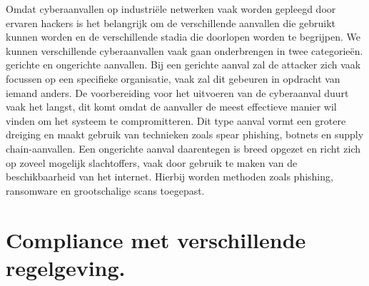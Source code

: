 Omdat cyberaanvallen op industriële netwerken vaak worden gepleegd door ervaren hackers is het belangrijk om de verschillende aanvallen die gebruikt kunnen worden en de verschillende stadia die doorlopen worden te begrijpen. We kunnen verschillende cyberaanvallen vaak gaan onderbrengen in twee categorieën. gerichte en ongerichte aanvallen. Bij een gerichte aanval zal de attacker zich vaak focussen op een specifieke organisatie, vaak zal dit gebeuren in opdracht van iemand anders. De voorbereiding voor het uitvoeren van de cyberaanval duurt vaak het langst, dit komt omdat de aanvaller de meest effectieve manier wil vinden om het systeem te compromitteren. Dit type aanval vormt een grotere dreiging en maakt gebruik van technieken zoals spear phishing, botnets en supply chain-aanvallen. Een ongerichte aanval daarentegen is breed opgezet en richt zich op zoveel mogelijk slachtoffers, vaak door gebruik te maken van de beschikbaarheid van het internet. Hierbij worden methoden zoals phishing, ransomware en grootschalige scans toegepast. \autocite{biju2019}


\section{Compliance met verschillende regelgeving.}
